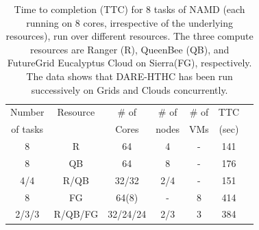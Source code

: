 \documentclass{sig-alternate}
\begin{document}
 \begin{table}
\small
 \begin{tabular}{|c|c|c|c|c|c|c|} 
 \hline 
 Number           & Resource    & \# of &  \# of     &     \# of     &	TTC  \\
of tasks                &     &  Cores    &nodes&   VMs  & (sec) \\  
\hline
8& R&	64	&4 & - &141\\
\hline                  
8& QB	&	64& 8 &	-&176 \\
\hline
4/4&R/QB	&	32/32 &2/4&-&151\\
\hline
8&FG	&	64(8) & - &8&414 \\
\hline
2/3/3&R/QB/FG	&32/24/24&2/3&	3 &384\\
\hline


\end{tabular}
\caption{Time to completion (TTC) for 8 tasks of NAMD (each running on 8 cores,
  irrespective of the underlying resources), run over different resources. The three
  compute resources are Ranger (R), QueenBee (QB), 
  and  FutureGrid  Eucalyptus Cloud on Sierra(FG), respectively. The
  data shows that DARE-HTHC has been run successively on Grids and
  Clouds concurrently.}
 \label{table:HTHP-Distributed} 
\end{table}
\end{document}

